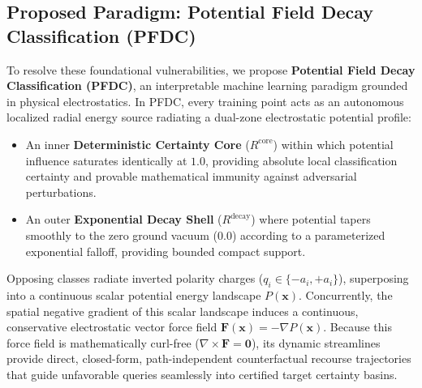 \documentclass[preprint,review,12pt]{elsarticle}
\begin{document}
\subsection{Proposed Paradigm: Potential Field Decay Classification (PFDC)}
\label{sec:proposed_pfdc}
To resolve these foundational vulnerabilities, we propose \textbf{Potential Field Decay Classification (PFDC)}, an interpretable machine learning paradigm grounded in physical electrostatics. In PFDC, every training point acts as an autonomous localized radial energy source radiating a dual-zone electrostatic potential profile:
\begin{itemize}
    \item An inner \textbf{Deterministic Certainty Core} ($R^{\mathrm{core}}$) within which potential influence saturates identically at $1.0$, providing absolute local classification certainty and provable mathematical immunity against adversarial perturbations.
    \item An outer \textbf{Exponential Decay Shell} ($R^{\mathrm{decay}}$) where potential tapers smoothly to the zero ground vacuum ($0.0$) according to a parameterized exponential falloff, providing bounded compact support.
\end{itemize}
Opposing classes radiate inverted polarity charges ($q_i \in \{-a_i, +a_i\}$), superposing into a continuous scalar potential energy landscape $P(\mathbf{x})$. Concurrently, the spatial negative gradient of this scalar landscape induces a continuous, conservative electrostatic vector force field $\mathbf{F}(\mathbf{x}) = -\nabla P(\mathbf{x})$. Because this force field is mathematically curl-free ($\nabla \times \mathbf{F} = \mathbf{0}$), its dynamic streamlines provide direct, closed-form, path-independent counterfactual recourse trajectories that guide unfavorable queries seamlessly into certified target certainty basins.
\end{document}
